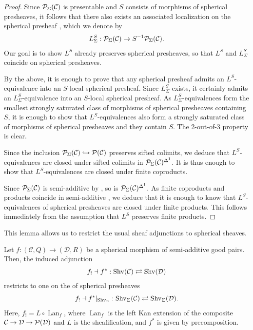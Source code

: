 \documentclass[a4paper,10pt, oneside]{amsart}
\begin{document}
	\begin{proof}
		Since $\mathcal{P}_{\Sigma}(\mathcal{C})$ is presentable and $S$ consists of morphisms of spherical presheaves, it follows that there also exists an associated localization on the spherical presheaf \infcat, which we denote by $$L_{\Sigma}^S: \mathcal{P}_{\Sigma}(\mathcal{C}) \rightarrow S^{-1} \mathcal{P}_{\Sigma}(\mathcal{C}).$$ Our goal is to show $L^S$ already preserves spherical presheaves, so that $L^S$ and $L_{\Sigma}^S$ coincide on spherical presheaves.
		
		By the above, it is enough to prove that any spherical presheaf admits an $L^S$-equivalence into an $S$-local spherical presheaf. Since $L_{\Sigma}^S$ exists, it certainly admits an $L_{\Sigma}^S$-equivalence into an $S$-local spherical presheaf. As $L_{\Sigma}^S$-equivalences form the smallest strongly saturated class of morphisms of spherical presheaves containing $S$, it is enough to show that $L^S$-equivalences also form a strongly saturated class of morphisms of spherical presheaves and they contain $S$. The 2-out-of-3 property is clear. 
		
		Since the inclusion $\mathcal{P}_{\Sigma}(\mathcal{C}) \hookrightarrow \mathcal{P}(\mathcal{C})$ preserves sifted colimits, we deduce that $L^S$-equivalences are closed under sifted colimits in $\mathcal{P}_{\Sigma}(\mathcal{C})^{\Delta^1}$. It is thus enough to show that $L^S$-equivalences are closed under finite coproducts.
		
		Since $\mathcal{P}_{\Sigma}(\mathcal{C})$ is semi-additive by \cite[Corollary 2.4]{ggn}, so is $\mathcal{P}_{\Sigma}(\mathcal{C})^{\Delta^1}$. As finite coproducts and products coincide in semi-additive \infcats, we deduce that it is enough to know that $L^S$-equivalences of spherical presheaves are closed under finite products. This follows immediately from the
		assumption that $L^S$ preserves finite products.
	\end{proof}
	This lemma allows us to restrict the usual sheaf adjunctions to spherical sheaves.
	\begin{prop}\label{ressphe}
		Let $f: (\mathcal{C},Q) \rightarrow (\mathcal{D},R)$ be a spherical morphism of semi-additive good pairs. Then, the induced adjunction $$f_! \dashv f^* : \operatorname{Shv}(\mathcal{C}) \rightleftarrows \operatorname{Shv}(\mathcal{D})$$ restricts to one on the \infcats of spherical presheaves $$f_! \dashv f^*|_{\operatorname{Shv}_\Sigma} : \operatorname{Shv}_\Sigma(\mathcal{C}) \rightleftarrows \operatorname{Shv}_\Sigma(\mathcal{D}).$$ Here, $f_!= L \circ \operatorname{Lan}_f$, where $\operatorname{Lan}_f$ is the left Kan extension of the composite $\mathcal{C} \rightarrow \mathcal{D} \rightarrow \mathcal{P}(\mathcal{D})$ and $L$ is the sheafification, and $f^*$ is given by precomposition. 
	\end{prop}
\end{document}
